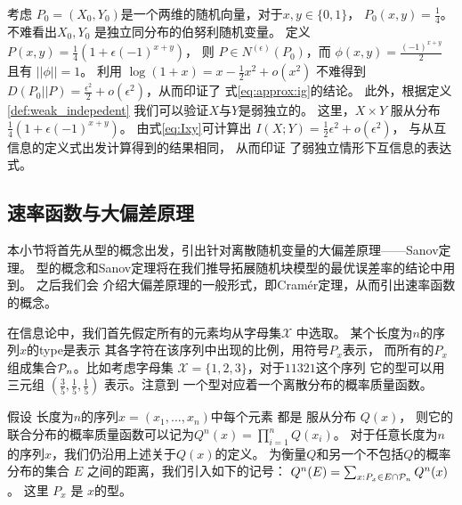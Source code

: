 \begin{example}\label{ex:Pweak_1}
考虑 $P_0=(X_0,Y_0)$是一个两维的随机向量，对于$x,y \in \{0,1\}$，
$P_0(x,y)=\frac{1}{4}$。
不难看出$X_0,Y_0$
是独立同分布的伯努利随机变量。
定义 $P(x,y)=\frac{1}{4}(1+\epsilon (-1)^{x+y})$，
则 $P\in N^{(\epsilon)}(P_0)$，而
$\phi(x,y) = \frac{(-1)^{x+y}}{2}$
且有 $||\phi||=1$。
利用 $\log(1+x) = x - \frac{1}{2}x^2 + o(x^2)$
不难得到 $D(P_0||P)=\frac{\epsilon^2}{2}
+o(\epsilon^2)$，从而印证了
式\eqref{eq:approx:ig}的结论。
此外，根据定义 \ref{def:weak_indepedent} 
我们可以验证$X$与$Y$是弱独立的。
这里，$X\times Y$ 服从分布$\frac{1}{4}(1+\epsilon (-1)^{x+y})$。
由式\eqref{eq:Ixy}可计算出
$I(X;Y)=\frac{1}{2}\epsilon^2+o(\epsilon^2)$，
与从互信息的定义式出发计算得到的结果相同，
从而印证
了弱独立情形下互信息的表达式。
\end{example}

\subsection{速率函数与大偏差原理}
本小节将首先从型的概念出发，引出针对离散随机变量的大偏差原理——Sanov定理。
型的概念和Sanov定理将在我们推导拓展随机块模型的最优误差率的结论中用到。
之后我们会
介绍大偏差原理的一般形式，即Cramér定理，从而引出速率函数的概念。

在信息论中，我们首先假定所有的元素均从字母集$\mathcal{X}$
中选取。
某个长度为$n$的序列$x$的\gls{type}是表示
其各字符在该序列中出现的比例，用符号$P_x$表示，
而所有的$P_x$组成集合$\P_n$。比如考虑字母集
$\mathcal{X}=\{1,2,3\}$，对于$11321$这个序列
它的型可以用三元组 $(\frac{3}{5}, 
\frac{1}{5}, \frac{1}{5})$ 表示。注意到
一个型对应着一个离散分布的概率质量函数。

假设 长度为$n$的序列$x=(x_1,\dots, x_n)$中每个元素 都是  
服从分布 $Q(x)$，
则它的联合分布的概率质量函数可以记为$Q^n(x)=\prod_{i=1}^n Q(x_i)$。
对于任意长度为$n$的序列$x$，我们仍沿用上述关于$Q(x)$的定义。
为衡量$Q$和另一个不包括$Q$的概率分布的集合 $E$ 之间的距离，我们引入如下的记号：
$Q^n(E) = \sum_{x: P_x \in E \cap \P_n} Q^n(x)$。
这里 $P_x$ 是 $x$的型。

